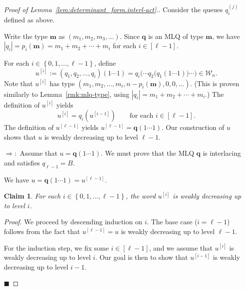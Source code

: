\documentclass[reqno]{amsart}
\newcommand{\0}{\phantom{c}}
\newcommand{\mm}{\mathbf{m}}
\newcommand{\qq}{\mathbf{q}}
\newcommand{\mcW}{\mathcal{W}}
\newenvironment{subproof}{\textit{Proof.} }{\hfill$\blacksquare$\medskip}
\newcommand{\set}[1]{\left\{ #1 \right\}}
\newcommand{\abs}[1]{\left| #1 \right|}
\newcommand{\tup}[1]{\left( #1 \right)}
\newcommand{\ive}[1]{\left[ #1 \right]}
\theoremstyle{plain}
\newtheorem{claim}[thm]{Claim}
\theoremstyle{definition}
\numberwithin{equation}{section}
\begin{document}
\begin{proof}[Proof of Lemma~\ref{lem:determinant_form.interl-act}.]
Consider the queues $q_i^{(j)}$ defined as above.

Write the type $\mm$ as $\tup{m_1, m_2, m_3, \ldots}$.
Since $\qq$ is an MLQ of type $\mm$, we have $\abs{q_i} = p_i(\mm) = m_1 + m_2 + \cdots + m_i$ for each $i \in \ive{\ell-1}$.

For each $i \in \set{0, 1, \dotsc, \ell-1}$, define
\[
u^{\left[  i\right]} := (q_1, q_2, \dotsc, q_i)(1 \dotsm 1)  = q_i\bigl( \cdots q_2\bigl( q_1(1 \dotsm 1) \bigr) \cdots \bigr)  \in \mcW_n .
\]
Note that $u^{\left[  i\right]  }$ has type $\tup{m_1, m_2, \dotsc, m_i, n-p_i(\mm), 0, 0, \ldots}$.
(This is proven similarly to Lemma~\ref{rmk:mlq-type}, using $\abs{q_i} = m_1 + m_2 + \cdots + m_i$.)
The definition of $u^{\left[  i\right]  }$ yields
\begin{equation}
\label{pf.lem:determinant_form.interl-act.rec}
u^{\left[  i\right]} = q_i\left(  u^{\left[  i-1\right]  }\right) \qquad \text{for each } i \in \ive{\ell-1}.
\end{equation}
The definition of $u^{\left[  \ell-1\right]  }$ yields $u^{\left[\ell-1\right]} = \qq(1\dotsm 1)$.
Our construction of $u$ shows that $u$ is weakly decreasing up to level $\ell-1$.

$\Longrightarrow:$
Assume that $u = \qq(1 \dotsm 1)$.
We must prove that the MLQ $\qq$ is interlacing and satisfies $q_{\ell-1} = B$.

We have $u = \qq(1\dotsm 1) = u^{\left[  \ell-1\right]  }$.

\begin{claim}
\label{claim:weakly_decreasing_level_i}
For each $i \in \set{0, 1, \dotsc, \ell-1} $, the word $u^{\left[  i\right]  }$ is weakly decreasing up to level $i$.
\end{claim}

\begin{subproof}
We proceed by descending induction on $i$.
The base case ($i=\ell-1$) follows from the fact that $u^{\left[  \ell-1\right]} = u$ is weakly decreasing up to level $\ell-1$.

For the induction step, we fix some $i \in \ive{\ell-1}$, and we assume that $u^{\left[i\right]}$ is weakly decreasing up to level $i$.
Our goal is then to show that $u^{\left[i-1\right]}$ is weakly decreasing up to level $i-1$.


\end{subproof}
\end{proof}
\end{document}

